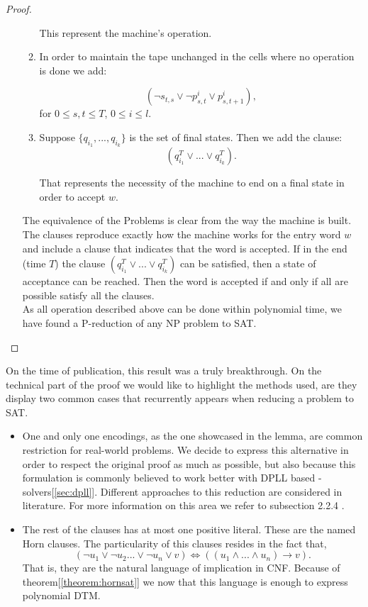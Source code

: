 \begin{proof}
\begin{itemize}
\begin{enumerate}
    This represent the machine's operation.
  \item In order to maintain the tape unchanged in the cells where no operation is done we add:

    $$(\neg s_{t,s} \lor \neg p_{s,t}^i \lor  p_{s,t+1}^i),  $$
    for $0 \le s,t \le T$, $0 \le i \le l$.
  \item Suppose $\{q_{i_1},...,q_{i_k}\}$ is the set of final states. Then we add the clause:
    $$ (q_{i_1}^T \lor ... \lor q_{i_k}^T).$$

    That represents the necessity of the machine to end on a final state in order to accept $w$.
    \end{enumerate}


    The equivalence of the Problems is clear from the way the machine is built. The clauses reproduce exactly how the machine works for the entry word $w$ and include a clause that indicates that the word is accepted. If in the end (time $T$) the clause $ (q_{i_1}^T \lor ... \lor q_{i_k}^T)$ can be satisfied, then a state of acceptance can be reached. Then the word is accepted if and only if all are possible satisfy all the clauses.\\

As all operation described above can be done within polynomial time, we have found a P-reduction of any NP problem to SAT.
  \end{itemize}
\end{proof}


On the time of publication, this result was a truly breakthrough. On the technical part of the proof we would like to highlight the methods used, are they display two common cases that recurrently appears when reducing a problem to SAT.

\begin{itemize}
\item One and only one encodings, as the one showcased in the lemma, are common restriction for real-world problems. We decide to express this alternative in order to respect the original proof as much as possible, but also because this formulation is commonly believed to work better with DPLL based - solvers[\ref{sec:dpll}]. Different approaches to this reduction are considered in literature. For more information on this area we refer to subsection 2.2.4 \cite{darwiche2009complete}.

\item The rest of the clauses has at most one positive literal. These are the named Horn clauses. The particularity of this clauses resides in the fact that,
  $$(\neg u_1 \lor \neg u_2 ... \lor \neg u_n \lor v) \iff ((u_1\land ... \land u_n) \to v).$$
  That is, they are the natural language of implication in CNF. Because of theorem[\ref{theorem:hornsat}] we now that this language is enough to express polynomial DTM.
\end{itemize}





